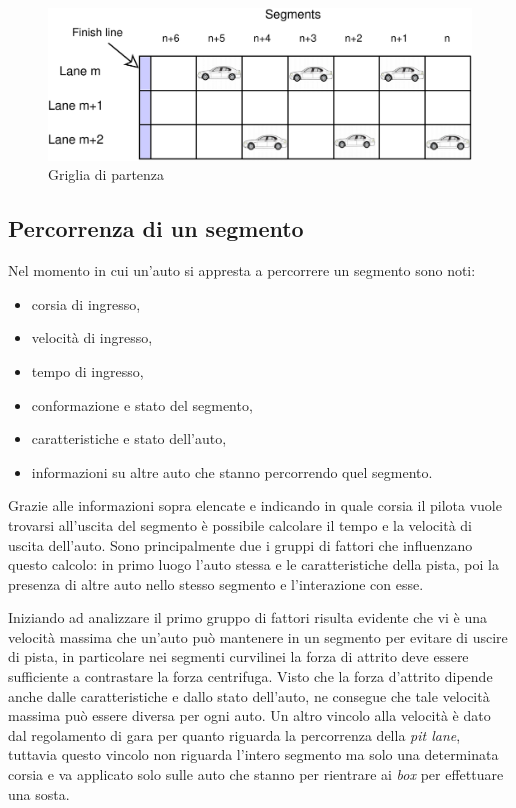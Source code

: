 \documentclass[a4paper]{report}
\begin{document}
\begin{figure}
\includegraphics[width=\textwidth]{diagrammi/StartGrid}
\caption{Griglia di partenza}
\label{fig:startGrid}
\end{figure}

\subsection{Percorrenza di un segmento}
\label{sec:percorrenza}
Nel momento in cui un'auto si appresta a percorrere un segmento sono noti:
\begin{itemize}
\item corsia di ingresso,
\item velocità di ingresso,
\item tempo di ingresso,
\item conformazione e stato del segmento,
\item caratteristiche e stato dell'auto,
\item informazioni su altre auto che stanno percorrendo quel segmento.
\end{itemize}

Grazie alle informazioni sopra elencate e indicando in quale corsia il pilota vuole trovarsi all'uscita del segmento è possibile calcolare il tempo e la velocità di uscita dell'auto. Sono principalmente due i gruppi di fattori che influenzano questo calcolo: in primo luogo l'auto stessa e le caratteristiche della pista, poi la presenza di altre auto nello stesso segmento e l'interazione con esse.

Iniziando ad analizzare il primo gruppo di fattori risulta evidente che vi è una velocità massima che un'auto può mantenere in un segmento per evitare di uscire di pista, in particolare nei segmenti curvilinei la forza di attrito deve essere sufficiente a contrastare la forza centrifuga.
Visto che la forza d'attrito dipende anche dalle caratteristiche e dallo stato dell'auto, ne consegue che tale velocità massima può essere diversa per ogni auto.
Un altro vincolo alla velocità è dato dal regolamento di gara per quanto riguarda la percorrenza della \textit{pit lane}, tuttavia questo vincolo non riguarda l'intero segmento ma solo una determinata corsia e va applicato solo sulle auto che stanno per rientrare ai \textit{box} per effettuare una sosta.
\end{document}
